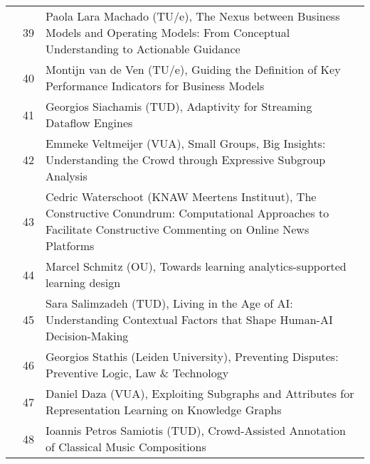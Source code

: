 \begin{xltabular}{\linewidth}{@{} l @{\hspace{0.5em}} l @{\hspace{1em}} X @{}}
	&	 39	&	Paola Lara Machado (TU/e), The Nexus between Business Models and Operating Models: From Conceptual Understanding to Actionable Guidance \\
	&	 40	&	Montijn van de Ven (TU/e), Guiding the Definition of Key Performance Indicators for Business Models \\
	&	 41	&	Georgios Siachamis (TUD), Adaptivity for Streaming Dataflow Engines \\
	&	 42	&	Emmeke Veltmeijer (VUA), Small Groups, Big Insights: Understanding the Crowd through Expressive Subgroup Analysis \\
	&	 43	&	Cedric Waterschoot (KNAW Meertens Instituut), The Constructive Conundrum: Computational Approaches to Facilitate Constructive Commenting on Online News Platforms \\
	&	 44	&	Marcel Schmitz (OU), Towards learning analytics-supported learning design \\
	&	 45	&	Sara Salimzadeh (TUD), Living in the Age of AI: Understanding Contextual Factors that Shape Human-AI Decision-Making \\
	&	 46	&	Georgios Stathis (Leiden University), Preventing Disputes: Preventive Logic, Law \& Technology \\
	&	 47	&	Daniel Daza (VUA), Exploiting Subgraphs and Attributes for Representation Learning on Knowledge Graphs \\
	&	 48	&	Ioannis Petros Samiotis (TUD), Crowd-Assisted Annotation of Classical Music Compositions \\


\end{xltabular}
